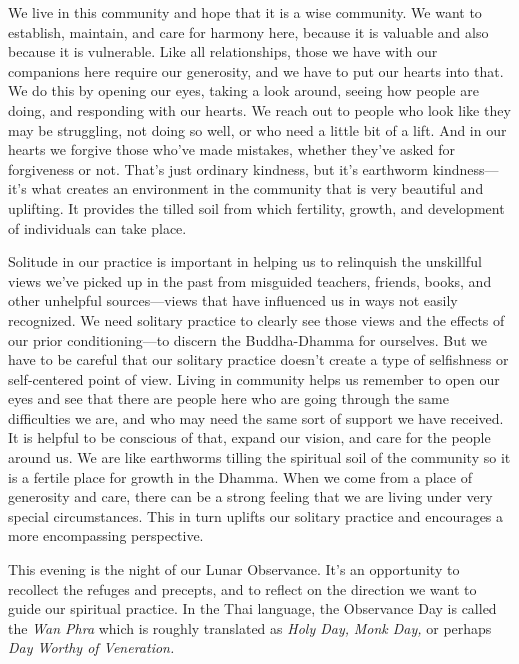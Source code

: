 We live in this community and hope that it is a wise community. We want 
to establish, maintain, and care for harmony here, because it is 
valuable and also because it is vulnerable. Like all relationships, 
those we have with our companions here require our generosity, and we 
have to put our hearts into that. We do this by opening our eyes, 
taking a look around, seeing how people are doing, and responding with 
our hearts. We reach out to people who look like they may be 
struggling, not doing so well, or who need a little bit of a lift. And 
in our hearts we forgive those who've made mistakes, whether they've 
asked for forgiveness or not. That's just ordinary kindness, but it's 
earthworm kindness---it's what creates an environment in the community 
that is very beautiful and uplifting. It provides the tilled soil from 
which fertility, growth, and development of individuals can take place.

Solitude in our practice is important in helping us to relinquish the 
unskillful views we've picked up in the past from misguided teachers, 
friends, books, and other unhelpful sources---views that have 
influenced us in ways not easily recognized. We need solitary practice 
to clearly see those views and the effects of our prior 
conditioning---to discern the Buddha-Dhamma for ourselves. But we have 
to be careful that our solitary practice doesn't create a type of 
selfishness or self-centered point of view. Living in community helps 
us remember to open our eyes and see that there are people here who are 
going through the same difficulties we are, and who may need the same 
sort of support we have received. It is helpful to be conscious of 
that, expand our vision, and care for the people around us. We are like 
earthworms tilling the spiritual soil of the community so it is a 
fertile place for growth in the Dhamma. When we come from a place of 
generosity and care, there can be a strong feeling that we are living 
under very special circumstances. This in turn uplifts our solitary 
practice and encourages a more encompassing perspective.


This evening is the night of our Lunar Observance. It's an opportunity 
to recollect the refuges and precepts, and to reflect on the direction 
we want to guide our spiritual practice. In the Thai language, the 
Observance Day is called the \emph{Wan Phra} which is roughly 
translated as \emph{Holy Day,} \emph{Monk Day,} or perhaps \emph{Day 
Worthy of Veneration.}

